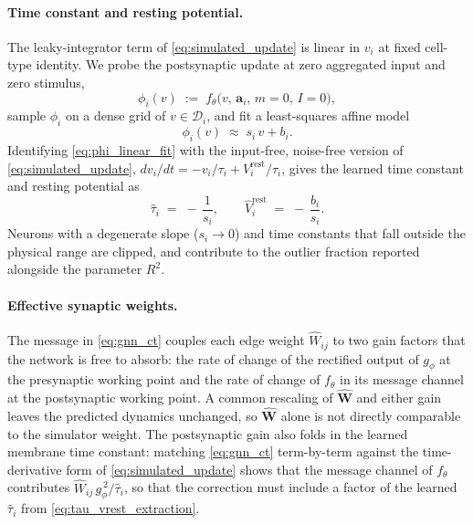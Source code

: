 \documentclass{article}
\begin{document}
\paragraph{Time constant and resting potential.}
The leaky-integrator term of \cref{eq:simulated_update} is
linear in $v_i$ at fixed cell-type identity. We probe the
postsynaptic update at zero aggregated input and zero stimulus,
\begin{equation}
    \phi_i(v) \;:=\; f_\theta\!\big(v,\,\mathbf{a}_i,\,m=0,\,I=0\big),
\end{equation}
sample $\phi_i$ on a dense grid of $v\in\mathcal{D}_i$, and fit a
least-squares affine model
\begin{equation}
    \phi_i(v) \;\approx\; s_i\,v + b_i.
    \label{eq:phi_linear_fit}
\end{equation}
Identifying \cref{eq:phi_linear_fit} with the input-free,
noise-free version of \cref{eq:simulated_update},
$dv_i/dt = -v_i/\tau_i + V_i^{\mathrm{rest}}/\tau_i$, gives the
learned time constant and resting potential as
\begin{equation}
    \hat{\tau}_i \;=\; -\,\frac{1}{s_i},
    \qquad
    \hat{V}^{\mathrm{rest}}_i \;=\; -\,\frac{b_i}{s_i}.
    \label{eq:tau_vrest_extraction}
\end{equation}
Neurons with a degenerate slope ($s_i \to 0$) and time constants
that fall outside the physical range are clipped, and contribute
to the outlier fraction reported alongside the parameter $R^2$.

\paragraph{Effective synaptic weights.}
The message in \cref{eq:gnn_ct} couples each edge weight
$\hat{W}_{ij}$ to two gain factors that the network is
free to absorb: the rate of change of the rectified output of
$g_\phi$ at the presynaptic working point and the rate of change of
$f_\theta$ in its message channel at the postsynaptic working
point. A common rescaling of $\hat{\mathbf{W}}$ and either gain
leaves the predicted dynamics unchanged, so $\hat{\mathbf{W}}$
alone is not directly comparable to the simulator weight. The
postsynaptic gain also folds in the learned membrane time constant:
matching \cref{eq:gnn_ct} term-by-term against the time-derivative
form of \cref{eq:simulated_update} shows that the message channel
of $f_\theta$ contributes $\hat W_{ij}\,g_\phi^{\,2}/\hat\tau_i$,
so that the correction must include a factor of the learned
$\hat\tau_i$ from \cref{eq:tau_vrest_extraction}.
\end{document}

